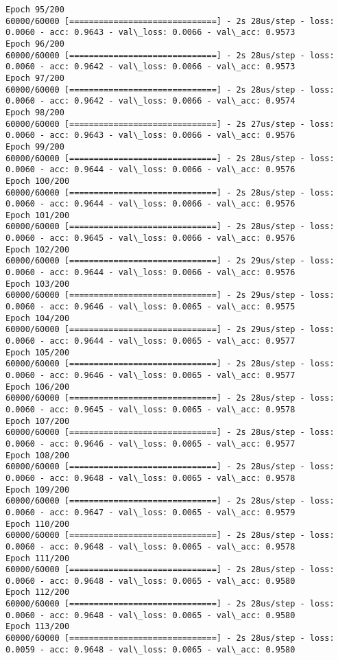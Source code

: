 \documentclass[11pt]{article}
\begin{document}
\begin{Verbatim}[commandchars=\\\{\}]
Epoch 95/200
60000/60000 [==============================] - 2s 28us/step - loss: 0.0060 - acc: 0.9643 - val\_loss: 0.0066 - val\_acc: 0.9573
Epoch 96/200
60000/60000 [==============================] - 2s 28us/step - loss: 0.0060 - acc: 0.9642 - val\_loss: 0.0066 - val\_acc: 0.9573
Epoch 97/200
60000/60000 [==============================] - 2s 28us/step - loss: 0.0060 - acc: 0.9642 - val\_loss: 0.0066 - val\_acc: 0.9574
Epoch 98/200
60000/60000 [==============================] - 2s 27us/step - loss: 0.0060 - acc: 0.9643 - val\_loss: 0.0066 - val\_acc: 0.9576
Epoch 99/200
60000/60000 [==============================] - 2s 28us/step - loss: 0.0060 - acc: 0.9644 - val\_loss: 0.0066 - val\_acc: 0.9576
Epoch 100/200
60000/60000 [==============================] - 2s 28us/step - loss: 0.0060 - acc: 0.9644 - val\_loss: 0.0066 - val\_acc: 0.9576
Epoch 101/200
60000/60000 [==============================] - 2s 28us/step - loss: 0.0060 - acc: 0.9645 - val\_loss: 0.0066 - val\_acc: 0.9576
Epoch 102/200
60000/60000 [==============================] - 2s 29us/step - loss: 0.0060 - acc: 0.9644 - val\_loss: 0.0066 - val\_acc: 0.9576
Epoch 103/200
60000/60000 [==============================] - 2s 29us/step - loss: 0.0060 - acc: 0.9646 - val\_loss: 0.0065 - val\_acc: 0.9575
Epoch 104/200
60000/60000 [==============================] - 2s 29us/step - loss: 0.0060 - acc: 0.9644 - val\_loss: 0.0065 - val\_acc: 0.9577
Epoch 105/200
60000/60000 [==============================] - 2s 28us/step - loss: 0.0060 - acc: 0.9646 - val\_loss: 0.0065 - val\_acc: 0.9577
Epoch 106/200
60000/60000 [==============================] - 2s 28us/step - loss: 0.0060 - acc: 0.9645 - val\_loss: 0.0065 - val\_acc: 0.9578
Epoch 107/200
60000/60000 [==============================] - 2s 28us/step - loss: 0.0060 - acc: 0.9646 - val\_loss: 0.0065 - val\_acc: 0.9577
Epoch 108/200
60000/60000 [==============================] - 2s 28us/step - loss: 0.0060 - acc: 0.9648 - val\_loss: 0.0065 - val\_acc: 0.9578
Epoch 109/200
60000/60000 [==============================] - 2s 28us/step - loss: 0.0060 - acc: 0.9647 - val\_loss: 0.0065 - val\_acc: 0.9579
Epoch 110/200
60000/60000 [==============================] - 2s 28us/step - loss: 0.0060 - acc: 0.9648 - val\_loss: 0.0065 - val\_acc: 0.9578
Epoch 111/200
60000/60000 [==============================] - 2s 28us/step - loss: 0.0060 - acc: 0.9648 - val\_loss: 0.0065 - val\_acc: 0.9580
Epoch 112/200
60000/60000 [==============================] - 2s 28us/step - loss: 0.0060 - acc: 0.9648 - val\_loss: 0.0065 - val\_acc: 0.9580
Epoch 113/200
60000/60000 [==============================] - 2s 28us/step - loss: 0.0059 - acc: 0.9648 - val\_loss: 0.0065 - val\_acc: 0.9580

\end{Verbatim}
\end{document}
